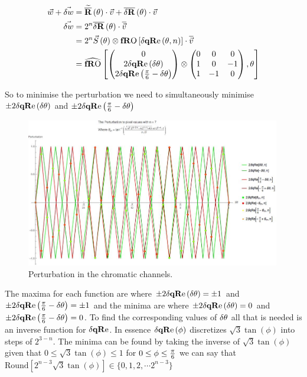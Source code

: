 \begin{align*}
\w+\dW &= \nRa[\theta] \cdot \rgb+\dnR[\theta] \cdot \rgb \\
\dW &= 2^n\dnR[\theta] \cdot \normed{\rgb} \\
        &= 2^n\Scale[\theta] \otimes \fRO \left[ \dqRe[ \theta, n ] \right] \cdot \normed{\rgb} \\
        &= \fROm \left[  
        \begin{pmatrix}
         0                                     \\
         2 \dqRe[ \thetaA ]              \\
         2 \dqRe[ \Pii{6} -\thetaA]   \\
        \end{pmatrix} \otimes
        \begin{pmatrix}
         0  &    0  &   0  \\
         1  &    0  & -1  \\
         1  & - 1  &   0  \\
        \end{pmatrix}
          ,\theta \right]
\end{align*}

So to minimise the perturbation we need to simultaneously minimise $\pm 2 \dqRe[ \thetaA ]  $ and $\pm 2 \dqRe[ \Pii{6} -\thetaA]$


\begin{figure}[h!]
  \centering
    \includegraphics[width=0.99\textwidth]{Chapter2/Figs/PtbToChanBoth.jpg}
    \caption{Perturbation in the chromatic channels.}  \label{fig:PtbToChan}
\end{figure}

The maxima for each function are where $\pm 2 \dqRe[ \thetaA ]  = \pm 1$ and $\pm 2 \dqRe[ \Pii{6} -\thetaA]= \pm 1$ and the minima are where $\pm 2 \dqRe[ \thetaA ]  = 0$ and $\pm 2 \dqRe[ \Pii{6} -\thetaA] = 0$. To find the corresponding values of $\delta\theta$ all that is needed is an inverse function for $\dqRe$. In essence $\dqRe[\phi]$ discretizes $\sqrt{3} \tan (\phi )$ into steps of $2^{3-n}$. The minima can be found by taking the inverse of $\sqrt{3} \tan (\phi )$ given that
$0\le\sqrt{3} \tan (\phi )\le1$ for $0 \le \phi \le \frac{\pi}{6}$ we can say that $\text{Round}\left[ 2^{n-3}\sqrt{3} \tan (\phi ) \right] \in \{ 0, 1, 2, \cdots 2^{n-3} \}$ 


